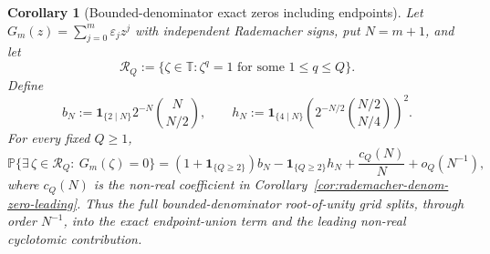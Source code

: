 \documentclass[11pt]{amsart}
\numberwithin{equation}{section}
\newtheorem{corollary}[theorem]{Corollary}
\theoremstyle{definition}
\theoremstyle{remark}
\newcommand{\T}{\mathbb T}
\newcommand{\Prob}{\mathbb P}
\begin{document}
\begin{corollary}[Bounded-denominator exact zeros including endpoints]
\label{cor:rademacher-denom-zero-with-endpoints}
Let \(G_m(z)=\sum_{j=0}^m\varepsilon_jz^j\) with independent Rademacher signs,
put \(N=m+1\), and let
\[
  \mathcal R_Q:=\{\zeta\in\T:\zeta^q=1\text{ for some }1\le q\le Q\}.
\]
Define
\[
  b_N:=\mathbf1_{\{2\mid N\}}2^{-N}\binom{N}{N/2},
  \qquad
  h_N:=\mathbf1_{\{4\mid N\}}
       \left(2^{-N/2}\binom{N/2}{N/4}\right)^2 .
\]
For every fixed \(Q\ge1\),
\[
  \Prob\{\exists\,\zeta\in\mathcal R_Q:\ G_m(\zeta)=0\}
  =
  (1+\mathbf1_{\{Q\ge2\}})b_N
  -\mathbf1_{\{Q\ge2\}}h_N
  +\frac{c_Q(N)}{N}+o_Q(N^{-1}),
\]
where \(c_Q(N)\) is the non-real coefficient in
Corollary~\ref{cor:rademacher-denom-zero-leading}.  Thus the full
bounded-denominator root-of-unity grid splits, through order \(N^{-1}\), into
the exact endpoint-union term and the leading non-real cyclotomic contribution.
\end{corollary}
\end{document}
